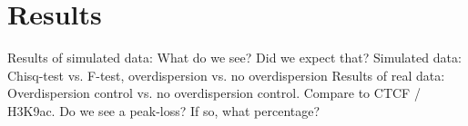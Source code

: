 \section{Results}

Results of simulated data: What do we see? Did we expect that?
Simulated data: Chisq-test vs. F-test, overdispersion vs. no overdispersion
Results of real data: Overdispersion control vs. no overdispersion control.
Compare to CTCF / H3K9ac. Do we see a peak-loss? If so, what percentage?
  
  